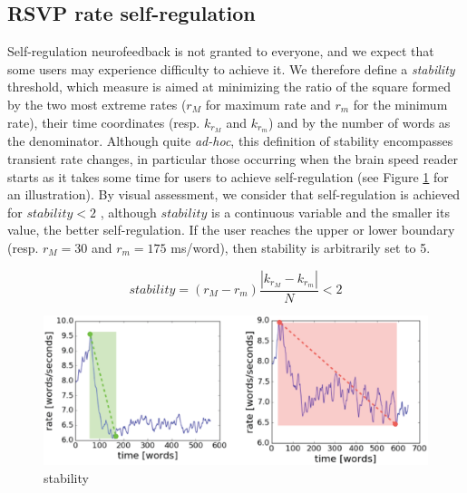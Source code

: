 \subsection{RSVP rate self-regulation}
Self-regulation neurofeedback is not granted to everyone, and we expect that some users may experience difficulty to achieve it. We therefore define a {\it stability} threshold, which measure is aimed at minimizing the ratio of the square formed by the two most extreme rates ($r_M$ for maximum rate and $r_m$ for the minimum rate), their time coordinates (resp. $k_{r_M}$ and  $k_{r_m}$) and by the number of words as the denominator. Although quite {\it ad-hoc}, this definition of stability encompasses transient rate changes, in particular those occurring when the brain speed reader starts as it takes some time for users to achieve self-regulation (see Figure \ref{fig:stability} for an illustration). By visual assessment, we consider that self-regulation is achieved for $stability < 2$ , although $stability$ is a continuous variable and the smaller its value, the better self-regulation. If the user reaches the upper or lower boundary (resp. $r_M = 30$  and $r_m = 175$ ms/word), then stability is arbitrarily set to 5.

\begin{equation}
stability = (r_M - r_m) \frac{|k_{r_M} - k_{r_m}|}{N} < 2
\label{eq:stability}
\end{equation}

\begin{figure}[!h]
\centering
\includegraphics[width=0.9\columnwidth]{../figures2/stability_lowres.eps}
\caption{stability}
\label{fig:stability}
\end{figure}